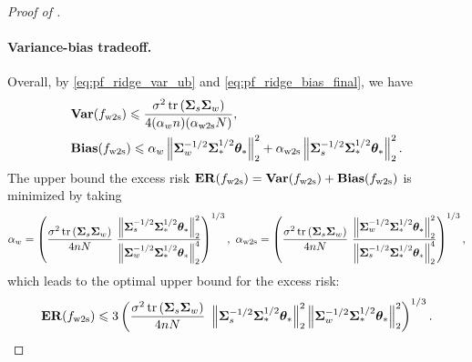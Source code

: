 \begin{proof}[Proof of ]
    \paragraph{Variance-bias tradeoff.}
    Overall, by \eqref{eq:pf_ridge_var_ub} and \eqref{eq:pf_ridge_bias_final}, we have
    \begin{align*}
        &\mathbf{Var}(f_{\mathrm{w2s}}) \leqslant \frac{\sigma^2 \mathop{\mathrm{tr}}\left(\boldsymbol{\Sigma}_s \boldsymbol{\Sigma}_w\right)}{4 (\alpha_w n) (\alpha_{\mathrm{w2s}} N)}, \\
        &\mathbf{Bias}(f_{\mathrm{w2s}}) \leqslant \alpha_w \left\|\boldsymbol{\Sigma}_w^{-1/2} \boldsymbol{\Sigma}_*^{1/2} \boldsymbol{\theta}_*\right\|_2^2 + \alpha_{\mathrm{w2s}} \left\|\boldsymbol{\Sigma}_s^{-1/2} \boldsymbol{\Sigma}_*^{1/2} \boldsymbol{\theta}_*\right\|_2^2.
    \end{align*}
    The upper bound the excess risk $\mathbf{ER}(f_{\mathrm{w2s}}) = \mathbf{Var}(f_{\mathrm{w2s}}) + \mathbf{Bias}(f_{\mathrm{w2s}})$ is minimized by taking 
    \begin{align*}
        \alpha_w = \rbr{\frac{\sigma^2 \tr\rbr{\Sigmab_s \Sigmab_w}}{4 n N}\ \frac{\nbr{\Sigmab_s^{-1/2} \Sigmab_*^{1/2} \thetab_*}_2^2}{\nbr{\Sigmab_w^{-1/2} \Sigmab_*^{1/2} \thetab_*}_2^4}}^{1/3}, \ 
        \alpha_\wts = \rbr{\frac{\sigma^2 \tr\rbr{\Sigmab_s \Sigmab_w}}{4 n N}\ \frac{\nbr{\Sigmab_w^{-1/2} \Sigmab_*^{1/2} \thetab_*}_2^2}{\nbr{\Sigmab_s^{-1/2} \Sigmab_*^{1/2} \thetab_*}_2^4}}^{1/3},
    \end{align*}
    which leads to the optimal upper bound for the excess risk:
    \begin{align*}
        \mathbf{ER}(f_{\mathrm{w2s}}) \leqslant 3 \left(\frac{\sigma^2 \mathop{\mathrm{tr}}\left(\boldsymbol{\Sigma}_s \boldsymbol{\Sigma}_w\right)}{4 n N}\ \left\|\boldsymbol{\Sigma}_s^{-1/2} \boldsymbol{\Sigma}_*^{1/2} \boldsymbol{\theta}_*\right\|_2^2 \left\|\boldsymbol{\Sigma}_w^{-1/2} \boldsymbol{\Sigma}_*^{1/2} \boldsymbol{\theta}_*\right\|_2^2\right)^{1/3}.
    \end{align*}
\end{proof}






